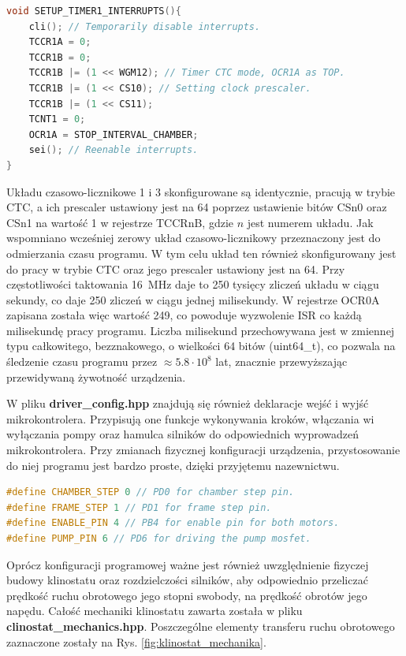 \begin{lstlisting}[language=C++, caption=Przykładowa konfiguracja pierwszego układu czasowo-licznikowego]
void SETUP_TIMER1_INTERRUPTS(){
	cli(); // Temporarily disable interrupts.
	TCCR1A = 0;
	TCCR1B = 0;
	TCCR1B |= (1 << WGM12); // Timer CTC mode, OCR1A as TOP.
	TCCR1B |= (1 << CS10); // Setting clock prescaler.
	TCCR1B |= (1 << CS11);
	TCNT1 = 0;
	OCR1A = STOP_INTERVAL_CHAMBER;
	sei(); // Reenable interrupts.
}
\end{lstlisting}
Układu czasowo-licznikowe 1 i 3 skonfigurowane są identycznie, pracują w trybie CTC, a ich prescaler ustawiony jest na 64 poprzez ustawienie bitów CSn0 oraz CSn1 na wartość 1 w rejestrze TCCRnB, gdzie $n$ jest numerem układu.  Jak wspomniano wcześniej zerowy układ czasowo-licznikowy przeznaczony jest do odmierzania czasu programu. W tym celu układ ten również skonfigurowany jest do pracy w trybie CTC oraz jego prescaler ustawiony jest na 64. Przy częstotliwości taktowania \SI{16}{MHz} daje to 250 tysięcy zliczeń układu w ciągu sekundy, co daje 250 zliczeń w ciągu jednej milisekundy. W rejestrze OCR0A zapisana została więc wartość 249, co powoduje wyzwolenie ISR co każdą milisekundę pracy programu. Liczba milisekund przechowywana jest w zmiennej typu całkowitego, bezznakowego, o wielkości 64 bitów (uint64\_t), co pozwala na śledzenie czasu programu przez $\approx5.8\cdot 10^8$ lat, znacznie przewyższając przewidywaną żywotność urządzenia.

W pliku \textbf{driver\_config.hpp} znajdują się również deklaracje wejść i wyjść mikrokontrolera. Przypisują one funkcje wykonywania kroków, włączania wi wyłączania pompy oraz hamulca silników do odpowiednich wyprowadzeń mikrokontrolera. Przy zmianach fizycznej konfiguracji urządzenia, przystosowanie do niej programu jest bardzo proste, dzięki przyjętemu nazewnictwu.

\begin{lstlisting}[language=C++, caption=Konfiguracja wyprowadzeń]
#define CHAMBER_STEP 0 // PD0 for chamber step pin.
#define FRAME_STEP 1 // PD1 for frame step pin.
#define ENABLE_PIN 4 // PB4 for enable pin for both motors.
#define PUMP_PIN 6 // PD6 for driving the pump mosfet.
\end{lstlisting}

Oprócz konfiguracji programowej ważne jest również uwzględnienie fizyczej budowy klinostatu oraz rozdzielczości silników, aby odpowiednio przeliczać prędkość ruchu obrotowego jego stopni swobody, na prędkość obrotów jego napędu. Całość mechaniki klinostatu zawarta została w pliku \textbf{clinostat\_mechanics.hpp}. Poszczególne elementy transferu ruchu obrotowego zaznaczone zostały na Rys. \ref{fig:klinostat_mechanika}.

